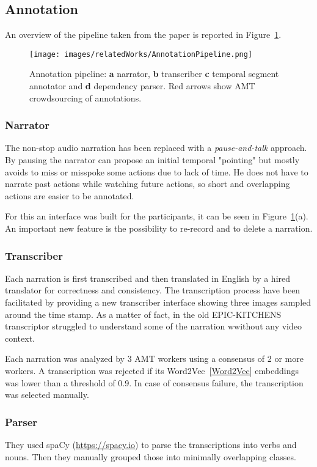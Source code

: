 \subsection{Annotation}
An overview of the pipeline taken from the paper is reported in Figure~\ref{fig:e100_ann}.
\begin{figure}[t]
    \centering
    \texttt{[image: images/relatedWorks/AnnotationPipeline.png]} 
    \caption{Annotation pipeline: \textbf{a} narrator, \textbf{b} transcriber
    \textbf{c} temporal segment annotator and \textbf{d} dependency parser.
    Red arrows show AMT crowdsourcing of annotations.}\label{fig:e100_ann}
\end{figure}
\subsubsection{Narrator}
The non-stop audio narration has been replaced with a \textit{pause-and-talk} approach.
By pausing the narrator can propose an initial temporal "pointing" but mostly avoids
to miss or misspoke some actions due to lack of time. He does not have to narrate
past actions while watching future actions, so short and overlapping actions are easier
to be annotated.

For this an interface was built for the participants, it can be seen in Figure~\ref{fig:e100_ann}(a).
An important new feature is the possibility to re-record and to delete a narration.

\subsubsection{Transcriber}
Each narration is first transcribed and then translated in English by a hired translator for correctness
and consistency. The transcription process have been facilitated by providing a new transcriber
interface showing three images sampled around the time stamp. As a matter of fact, in the 
old EPIC-KITCHENS transcriptor struggled to understand some of the narration wwithout
any video context.

Each narration was analyzed by 3 AMT workers using a consensus of 2 or more workers.
A transcription was rejected if its Word2Vec~\ref{Word2Vec} embeddings was lower than a threshold of 0.9.
In case of consensus failure, the transcription was selected manually.

\subsubsection{Parser}
They used spaCy (\url{https://spacy.io}) to parse the transcriptions into verbs and nouns.
Then they manually grouped those into minimally overlapping classes.
